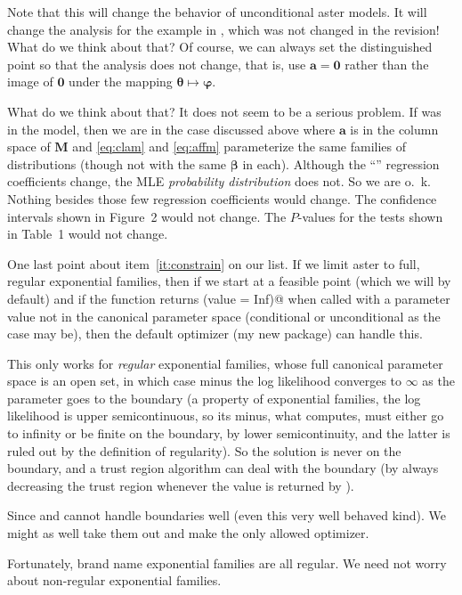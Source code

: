 \documentclass[11pt]{article}
\newcommand{\boldbeta}{\boldsymbol{\beta}}
\newcommand{\boldtheta}{\boldsymbol{\theta}}
\newcommand{\boldvarphi}{\boldsymbol{\varphi}}
\newcommand{\bolda}{\mathbf{a}}
\newcommand{\boldM}{\mathbf{M}}
\newcommand{\boldzero}{\boldsymbol{0}}
\begin{document}
Note that this will change the behavior of unconditional aster models.
It will change the analysis for the example in \citet{gws}, which
was not changed in the revision!  What do we think about that?
Of course, we can always set the distinguished point so that the analysis
does not change, that is, use $\bolda = \boldzero$ rather than the image
of $\boldzero$ under the mapping $\boldtheta \mapsto \boldvarphi$.

What do we think about that?  It does not seem to be a serious problem.
If \verb@varbl@ was in the model, then we are in the case discussed above
where $\bolda$ is in the column space of $\boldM$ and \eqref{eq:clam} and
\eqref{eq:affm} parameterize the same families of distributions (though
not with the same $\boldbeta$ in each).
Although the ``\verb@varb@'' regression coefficients change,
the MLE \emph{probability distribution} does not.  So we are o.~k.
Nothing besides those few regression coefficients would change.
The confidence intervals shown in Figure~2 would not change.
The $P$-values for the tests shown in Table~1 would not change.

\label{pg:regular}
One last point about item~\ref{it:constrain} on our list.
If we limit aster to full, regular exponential families,
then if we start at a feasible point (which we will by default)
and if the \verb@mlogl@ function returns
\verb@list(value = Inf)@ when called with a parameter value not in
the canonical parameter space (conditional or unconditional as the case
may be), then the default optimizer (my new \verb@trust@ package) can
handle this.

This only works for \emph{regular} exponential families, whose full
canonical parameter space is an open set, in which case minus the log
likelihood converges to $\infty$ as the parameter goes to the boundary
(a property of exponential families, the log likelihood is upper
semicontinuous, so its minus, what \verb@mlogl@ computes, must either
go to infinity or be finite on the boundary, by lower semicontinuity,
and the latter is ruled out by the definition of regularity).
So the solution is never on the boundary, and a trust region algorithm
can deal with the boundary (by always decreasing the trust region whenever
the value \verb@Inf@ is returned by \verb@mlogl@).

Since \verb@nlm@ and \verb@optim@ cannot handle boundaries well (even
this very well behaved kind).  We might as well take them out and make
\verb@trust@ the only allowed optimizer.

Fortunately, brand name exponential families are all regular.
We need not worry about non-regular exponential families.
\end{document}
